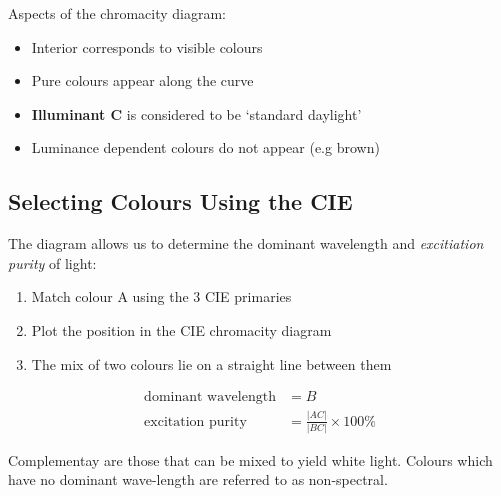 \documentclass{article}
\begin{document}
Aspects of the chromacity diagram:
\begin{itemize}
	\item Interior corresponds to visible colours
	\item Pure colours appear along the curve
	\item {\bf Illuminant C} is considered to be `standard daylight'  
	\item Luminance dependent colours do not appear (e.g brown) 
\end{itemize}

\subsection{Selecting Colours Using the CIE}
The diagram allows us to determine the dominant wavelength and {\it excitiation purity} of light:
\begin{enumerate}
	\item Match colour A using the 3 CIE primaries
	\item Plot the position in the CIE chromacity diagram
	\item The mix of two colours lie on a straight line between them
\end{enumerate}
\begin{align*}
	\text{dominant wavelength} &= B \\
	\text{excitation purity} &= \frac{|AC|}{|BC|} \times 100 \%
\end{align*}

Complementay are those that can be mixed to yield white light.
Colours which have no dominant wave-length are referred to as non-spectral.
\end{document}
